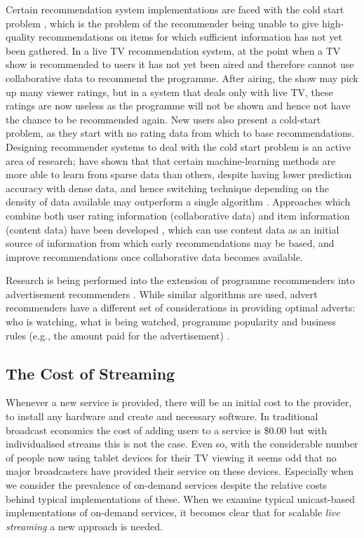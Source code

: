 	Certain recommendation system implementations are faced with the cold start problem \cite{cold-start-problem}, which is the problem of the recommender being unable to give high-quality recommendations on items for which sufficient information has not yet been gathered. In a live TV recommendation system, at the point when a TV show is recommended to users it has not yet been aired and therefore cannot use collaborative data to recommend the programme. After airing, the show may pick up many viewer ratings, but in a system that deals only with live TV, these ratings are now useless as the programme will not be shown and hence not have the chance to be recommended again. New users also present a cold-start problem, as they start with no rating data from which to base recommendations. Designing recommender systems to deal with the cold start problem is an active area of research; \citep{cold-start-problem} have shown that that certain machine-learning methods are more able to learn from sparse data than others, despite having lower prediction accuracy with dense data, and hence switching technique depending on the density of data available may outperform a single algorithm . Approaches which combine both user rating information (collaborative data) and item information (content data) have been developed \citep{generative_models}, which can use content data as an initial source of information from which early recommendations may be based, and improve recommendations once collaborative data becomes available.

	Research is being performed into the extension of programme recommenders into advertisement recommenders \citep{contextual_advertising}. While similar algorithms are used, advert recommenders have a different set of considerations in providing optimal adverts: who is watching, what is being watched, programme popularity and business rules (e.g., the amount paid for the advertisement) \citep{contextual_advertising}.

\subsection{The Cost of Streaming}
Whenever a new service is provided, there will be an initial cost to the provider, to install any hardware and create and necessary software. In traditional broadcast economics \citep{broadcastEconomics} the cost of adding users to a service is \$0.00 but with individualised streams this is not the case. Even so, with the considerable number of people now using tablet devices for their TV viewing it seems odd that no major broadcasters have provided their service on these devices. Especially when we consider the prevalence of on-demand services despite the relative costs behind typical implementations of these. When we examine typical unicast-based implementations of on-demand services, it becomes clear that for scalable \textit{live streaming} a new approach is needed.


